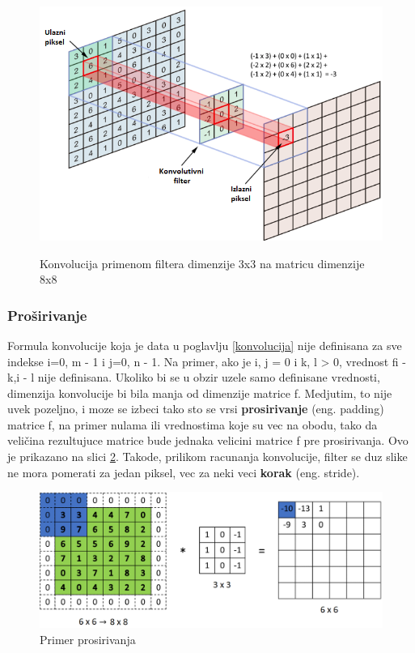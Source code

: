 \documentclass[a4paper]{article}
\begin{document}
\begin{figure}[h!]
\caption{Konvolucija primenom filtera dimenzije 3x3 na matricu dimenzije 8x8}
\centering
\includegraphics[scale=0.9]{convolution.png}
\label{fig:convolution}
\end{figure}

\subsubsection{Proširivanje}

Formula konvolucije koja je data u poglavlju \ref{konvolucija} nije definisana za sve indekse i=0, m - 1 i j=0, n - 1. Na primer, ako je i, j = 0 i k, l > 0, vrednost fi - k,i - l nije definisana. Ukoliko bi se u obzir uzele samo definisane vrednosti, dimenzija konvolucije bi bila manja od dimenzije matrice f. Medjutim, to nije uvek pozeljno, i moze se izbeci tako sto se vrsi \textbf{prosirivanje} (eng. padding) matrice f, na primer nulama ili vrednostima koje su vec na obodu, tako da veličina rezultujuce matrice bude jednaka velicini matrice f pre prosirivanja. Ovo je prikazano na slici \ref{fig:padding}. Takode, prilikom racunanja konvolucije, filter se duz slike ne mora pomerati za jedan piksel, vec za neki veci \textbf{ korak} (eng. stride).

\begin{figure}[h!]
\begin{center}
\includegraphics[scale=0.38]{padding.png}
\end{center}
\caption{Primer prosirivanja}
\label{fig:padding}
\end{figure}
\end{document}
